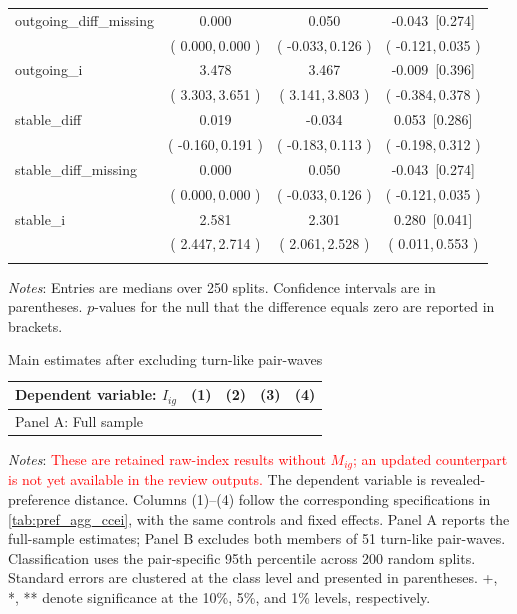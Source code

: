 \documentclass[11 pt]{article}
\begin{document}
\begin{table}[H]
\begin{threeparttable}
\begin{tabular}{lccc}
outgoing\_diff\_missing & 0.000 & 0.050 & -0.043 \,[0.274] \\
& ( 0.000,\,0.000 ) & ( -0.033,\,0.126 ) & ( -0.121,\,0.035 ) \\
\addlinespace
outgoing\_i & 3.478 & 3.467 & -0.009 \,[0.396] \\
& ( 3.303,\,3.651 ) & ( 3.141,\,3.803 ) & ( -0.384,\,0.378 ) \\
\addlinespace
stable\_diff & 0.019 & -0.034 & 0.053 \,[0.286] \\
& ( -0.160,\,0.191 ) & ( -0.183,\,0.113 ) & ( -0.198,\,0.312 ) \\
\addlinespace
stable\_diff\_missing & 0.000 & 0.050 & -0.043 \,[0.274] \\
& ( 0.000,\,0.000 ) & ( -0.033,\,0.126 ) & ( -0.121,\,0.035 ) \\
\addlinespace
stable\_i & 2.581 & 2.301 & 0.280 \,[0.041] \\
& ( 2.447,\,2.714 ) & ( 2.061,\,2.528 ) & ( 0.011,\,0.553 ) \\
\addlinespace
\hline \bottomrule
\end{tabular}
\end{threeparttable}
\begin{minipage}{\textwidth}
{\footnotesize \emph{Notes}: Entries are medians over 250 splits. Confidence intervals are in parentheses. $p$-values for the null that the difference equals zero are reported in brackets.}
\end{minipage}
\end{table}

\begin{table}[H]
\centering
\caption{Main estimates after excluding turn-like pair-waves}
\label{tab:taking_turns_exclusion}
\begin{tabular}{lcccc}
\toprule \hline
Dependent variable: $I_{ig}$ & (1) & (2) & (3) & (4) \\ \midrule
\multicolumn{5}{l}{Panel A: Full sample} \\

\end{tabular}
\begin{minipage}{\textwidth}
{\footnotesize \emph{Notes}: \textcolor{red}{These are retained raw-index results without $M_{ig}$; an updated counterpart is not yet available in the review outputs.}  The dependent variable is revealed-preference distance. Columns (1)--(4) follow the corresponding specifications in \autoref{tab:pref_agg_ccei}, with the same controls and fixed effects. Panel A reports the full-sample estimates; Panel B excludes both members of 51 turn-like pair-waves. Classification uses the pair-specific 95th percentile across 200 random splits. Standard errors are clustered at the class level and presented in parentheses. +, *, ** denote significance at the 10\%, 5\%, and 1\% levels, respectively.
}
\end{minipage}
\end{table}
\end{document}
